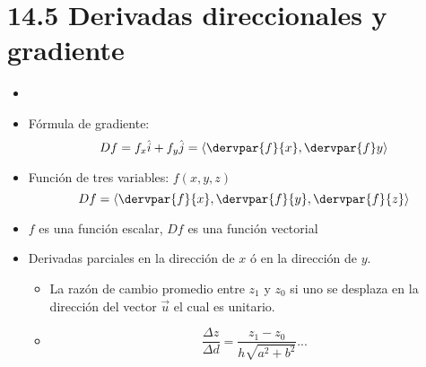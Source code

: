 \section{14.5 Derivadas direccionales y gradiente}
\begin{itemize}
    \item {}
    \item Fórmula de gradiente: 
        \[
          Df = f_x \hat{i} + f_y \hat{j} = \left\langle \dervpar{f}{x},\dervpar{f}y{} \right\rangle 
        \]
    
    \item Función de tres variables: $f(x,y,z)$
        \[
          Df = \left\langle \dervpar{f}{x},\dervpar{f}{y},\dervpar{f}{z} \right\rangle 
        \]
    
    \item $f$ es una función escalar, $Df$ es una función vectorial
    \item Derivadas parciales en la dirección de $x$ ó en la dirección de $y$.
        \begin{itemize}
            \item La razón de cambio promedio entre $z_1$ y $z_0$ si uno se desplaza en la dirección del vector $\vec{u}$ el cual es unitario.
            \item 
            \[
              \frac{\Delta z}{\Delta d} = \frac{z_1-z_0}{h\sqrt{a^2+b^2}} ...  
            \]
        \end{itemize}
    

\end{itemize}

